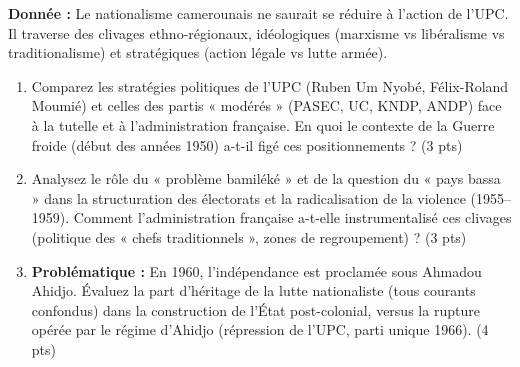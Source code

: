 \documentclass[11pt]{article}
\begin{document}
\begin{exercice}
\textbf{Donnée :} Le nationalisme camerounais ne saurait se réduire à l'action de l'UPC. Il traverse des clivages ethno-régionaux, idéologiques (marxisme vs libéralisme vs traditionalisme) et stratégiques (action légale vs lutte armée).
\begin{enumerate}
    \item Comparez les stratégies politiques de l'UPC (Ruben Um Nyobé, Félix-Roland Moumié) et celles des partis « modérés » (PASEC, UC, KNDP, ANDP) face à la tutelle et à l'administration française. En quoi le contexte de la Guerre froide (début des années 1950) a-t-il figé ces positionnements ? (3 pts)
    \item Analysez le rôle du « problème bamiléké » et de la question du « pays bassa » dans la structuration des électorats et la radicalisation de la violence (1955--1959). Comment l'administration française a-t-elle instrumentalisé ces clivages (politique des « chefs traditionnels », zones de regroupement) ? (3 pts)
    \item \textbf{Problématique :} En 1960, l'indépendance est proclamée sous Ahmadou Ahidjo. Évaluez la part d'héritage de la lutte nationaliste (tous courants confondus) dans la construction de l'État post-colonial, versus la rupture opérée par le régime d'Ahidjo (répression de l'UPC, parti unique 1966). (4 pts)
\end{enumerate}
\end{exercice}
\end{document}
